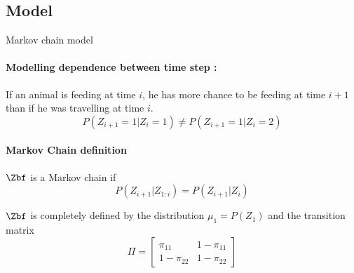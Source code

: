 \subsection{Model}
\begin{frame}{Markov chain model}
\paragraph{Modelling dependence between time step :}
If an animal is feeding at time $i$, he has more chance to be feeding at time $i+1$ than if he was travelling at time $i$.
$$P(Z_{i+1}=1 \vert Z_{i}=1) \ne P(Z_{i+1}=1 \vert Z_{i}=2)$$

\paragraph{Markov Chain definition}
$\Zbf$ is a Markov chain if 
$$P(Z_{i+1} \vert Z_{1:i}) =  P(Z_{i+1} \vert Z_{i})$$


$\Zbf$ is completely defined by the distribution $\mu_1=P(Z_1)$ and the transition matrix
$$\Pi =\left[\begin{matrix}
\pi_{11} & 1-\pi_{11}\\
1-\pi_{22} & 1-\pi_{22}
\end{matrix}\right]$$
\end{frame}


